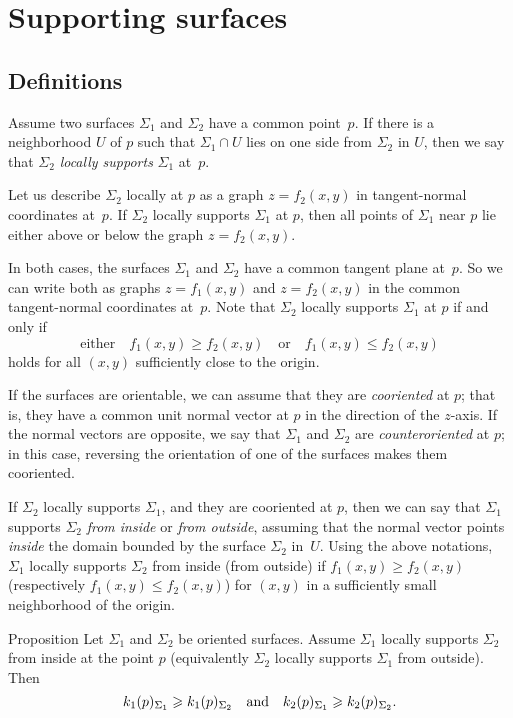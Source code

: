 \chapter{Supporting surfaces}
\label{chap:surface-support}

\section{Definitions}

Assume two surfaces $\Sigma_1$ and $\Sigma_2$ have a common point~$p$.
If there is a neighborhood $U$ of $p$ such that $\Sigma_1\cap U$ lies on one side from $\Sigma_2$ in $U$, then we say that $\Sigma_2$ \emph{locally supports} $\Sigma_1$ at~$p$.

Let us describe $\Sigma_2$ locally at $p$ as a graph $z=f_2(x,y)$ in tangent-normal coordinates at~$p$.
If $\Sigma_2$ locally supports $\Sigma_1$ at $p$, then  all points of $\Sigma_1$ near $p$ lie either above or below the graph $z=f_2(x,y)$.

In both cases, the surfaces $\Sigma_1$ and $\Sigma_2$ have a common tangent plane at~$p$.
So we can write both as graphs $z=f_1(x,y)$ and $z=f_2(x,y)$ in the common tangent-normal coordinates at~$p$.
Note that $\Sigma_2$ locally supports $\Sigma_1$ at $p$ if and only if 
\[\text{either}\quad f_1(x,y)\ge f_2(x,y)
\quad\text{or}\quad
f_1(x,y)\le f_2(x,y)\]
holds for all $(x,y)$ sufficiently close to the origin.

If the surfaces are orientable, we can assume that they are \emph{cooriented} at $p$;
that is, they have a common unit normal vector at $p$ in the direction of the $z$-axis.
If the normal vectors are opposite, we say that $\Sigma_1$ and $\Sigma_2$ are \emph{counteroriented} at $p$;
in this case, reversing the orientation of one of the surfaces makes them cooriented.

If $\Sigma_2$ locally supports $\Sigma_1$, and they are cooriented at $p$,
then we can say that $\Sigma_1$ supports $\Sigma_2$ \emph{from inside} or \emph{from outside},
assuming that the normal vector points {}\emph{inside} the domain bounded by the surface $\Sigma_2$ in~$U$.
Using the above notations, $\Sigma_1$ locally supports $\Sigma_2$ from inside (from outside)  if $f_1(x,y)\ge f_2(x,y)$ (respectively $f_1(x,y)\le f_2(x,y)$) for $(x,y)$ in a sufficiently small neighborhood of the origin.

\begin{thm}{Proposition}\label{prop:surf-support}
Let $\Sigma_1$ and $\Sigma_2$ be oriented surfaces.
Assume $\Sigma_1$ locally supports $\Sigma_2$ from inside at the point $p$ (equivalently $\Sigma_2$ locally supports $\Sigma_1$ from outside).
Then 
\[k_1(p)_{\Sigma_1}\ge k_1(p)_{\Sigma_2}\quad\text{and}\quad k_2(p)_{\Sigma_1}\z\ge k_2(p)_{\Sigma_2}.\]
\end{thm}

